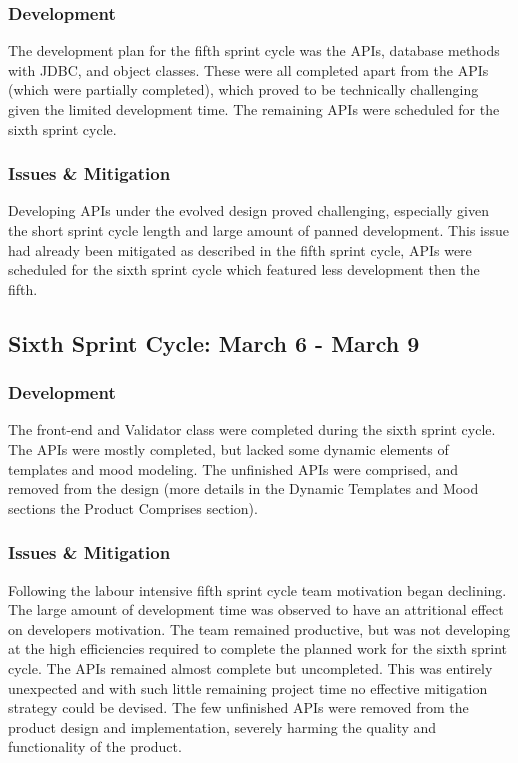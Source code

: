 \documentclass[9pt, titlepage]{extarticle}
\begin{document}
\subsubsection{Development}

The development plan for the fifth sprint cycle was the APIs, database methods with JDBC, and object classes. These were all completed apart from the APIs (which were partially completed), which proved to be technically challenging given the limited development time. The remaining APIs were scheduled for the sixth sprint cycle.

\subsubsection{Issues \& Mitigation}

Developing APIs under the evolved design proved challenging, especially given the short sprint cycle length and large amount of panned development. This issue had already been mitigated as described in the fifth sprint cycle, APIs were scheduled for the sixth sprint cycle which featured less development then the fifth.

\subsection{Sixth Sprint Cycle: March 6 - March 9}

\subsubsection{Development}

The front-end and Validator class were completed during the sixth sprint cycle. The APIs were mostly completed, but lacked some dynamic elements of templates and mood modeling. The unfinished APIs were comprised, and removed from the design (more details in the Dynamic Templates and Mood sections the Product Comprises section).

\subsubsection{Issues \& Mitigation}

Following the labour intensive fifth sprint cycle team motivation began declining. The large amount of development time was observed to have an attritional effect on developers motivation. The team remained productive, but was not developing at the high efficiencies required to complete the planned work for the sixth sprint cycle. The APIs remained almost complete but uncompleted. This was entirely unexpected and with such little remaining project time no effective mitigation strategy could be devised. The few unfinished APIs were removed from the product design and implementation, severely harming the quality and functionality of the product.
\end{document}
